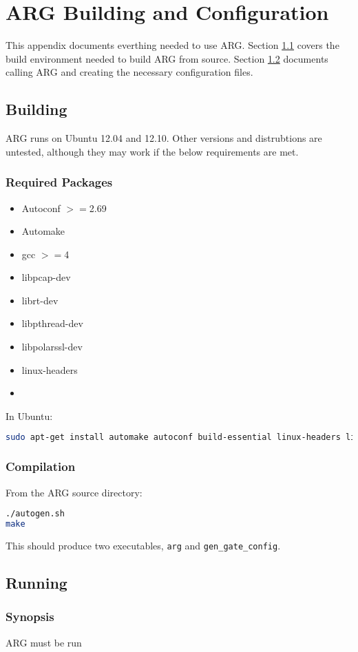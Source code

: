 \chapter{\ac{ARG} Building and Configuration}
\label{chp:argconf}

\par This appendix documents everthing needed to use \ac{ARG}. Section \ref{sec:arg_buildenv} covers the build environment needed to build \ac{ARG} from source. Section \ref{sec:arg_cmd} documents calling \ac{ARG} and creating the necessary configuration files.

\section{Building}
\label{sec:arg_buildenv}
\par \ac{ARG} runs on Ubuntu 12.04 and 12.10. Other versions and distrubtions are untested, although they may work if the below requirements are met. 

\subsection{Required Packages}
{\singlespace
\begin{itemize}
\item Autoconf $>=$2.69
\item Automake
\item gcc $>=$4
\item libpcap-dev
\item librt-dev
\item libpthread-dev
\item libpolarssl-dev
\item linux-headers

\item {}
\end{itemize}
}

\par In Ubuntu:
\begin{lstlisting}[language=bash]
sudo apt-get install automake autoconf build-essential linux-headers libpcap-dev libpolarssl-dev
\end{lstlisting}

\subsection{Compilation}
\par From the \ac{ARG} source directory:
\begin{lstlisting}[language=bash]
./autogen.sh
make
\end{lstlisting}

\par This should produce two executables, \texttt{arg} and \texttt{gen\_gate\_config}.

\section{Running}
\label{sec:arg_cmd}
\subsection{Synopsis}
\par \ac{ARG} must be run 

